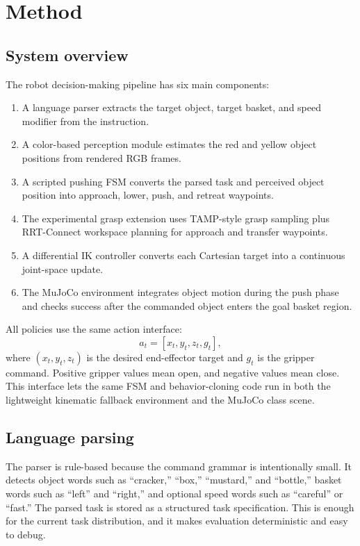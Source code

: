 \documentclass{article}
\begin{document}
\section{Method}

\subsection{System overview}

The robot decision-making pipeline has six main components:

\begin{enumerate}
  \item A language parser extracts the target object, target basket, and speed modifier from the instruction.
  \item A color-based perception module estimates the red and yellow object positions from rendered RGB frames.
  \item A scripted pushing FSM converts the parsed task and perceived object position into approach, lower, push, and retreat waypoints.
  \item The experimental grasp extension uses TAMP-style grasp sampling plus RRT-Connect workspace planning for approach and transfer waypoints.
  \item A differential IK controller converts each Cartesian target into a continuous joint-space update.
  \item The MuJoCo environment integrates object motion during the push phase and checks success after the commanded object enters the goal basket region.
\end{enumerate}

All policies use the same action interface:
\[
  a_t = [x_t, y_t, z_t, g_t],
\]
where $(x_t, y_t, z_t)$ is the desired end-effector target and $g_t$ is the gripper command. Positive gripper values mean open, and negative values mean close. This interface lets the same FSM and behavior-cloning code run in both the lightweight kinematic fallback environment and the MuJoCo class scene.

\subsection{Language parsing}

The parser is rule-based because the command grammar is intentionally small. It detects object words such as ``cracker,'' ``box,'' ``mustard,'' and ``bottle,'' basket words such as ``left'' and ``right,'' and optional speed words such as ``careful'' or ``fast.'' The parsed task is stored as a structured task specification. This is enough for the current task distribution, and it makes evaluation deterministic and easy to debug.
\end{document}
